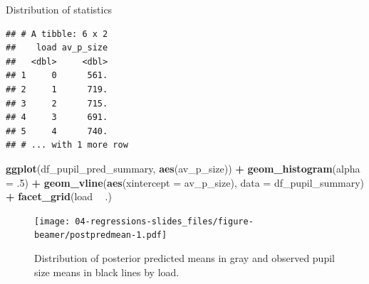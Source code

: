 \documentclass[12pt,ignorenonframetext,aspectratio=169]{beamer}
\newenvironment{Shaded}{\begin{snugshade}}{\end{snugshade}}
\newcommand{\CommentTok}[1]{\textcolor[rgb]{0.56,0.35,0.01}{\textit{#1}}}
\newcommand{\DataTypeTok}[1]{\textcolor[rgb]{0.13,0.29,0.53}{#1}}
\newcommand{\FloatTok}[1]{\textcolor[rgb]{0.00,0.00,0.81}{#1}}
\newcommand{\KeywordTok}[1]{\textcolor[rgb]{0.13,0.29,0.53}{\textbf{#1}}}
\newcommand{\NormalTok}[1]{#1}
\newcommand{\OperatorTok}[1]{\textcolor[rgb]{0.81,0.36,0.00}{\textbf{#1}}}
\newcommand{\StringTok}[1]{\textcolor[rgb]{0.31,0.60,0.02}{#1}}
\begin{document}
\begin{frame}[fragile]{Distribution of statistics}
\protect\hypertarget{distribution-of-statistics}{}

\scriptsize

\begin{Shaded}
\end{Shaded}

\begin{verbatim}
## # A tibble: 6 x 2
##    load av_p_size
##   <dbl>     <dbl>
## 1     0      561.
## 2     1      719.
## 3     2      715.
## 4     3      691.
## 5     4      740.
## # ... with 1 more row
\end{verbatim}

\normalsize

\end{frame}

\begin{frame}[fragile]



\scriptsize

\begin{Shaded}
\begin{Highlighting}[]
\KeywordTok{ggplot}\NormalTok{(df_pupil_pred_summary, }\KeywordTok{aes}\NormalTok{(av_p_size)) }\OperatorTok{+}
\StringTok{  }\KeywordTok{geom_histogram}\NormalTok{(}\DataTypeTok{alpha =} \FloatTok{.5}\NormalTok{) }\OperatorTok{+}
\StringTok{  }\KeywordTok{geom_vline}\NormalTok{(}\KeywordTok{aes}\NormalTok{(}\DataTypeTok{xintercept =}\NormalTok{ av_p_size), }\DataTypeTok{data =}\NormalTok{ df_pupil_summary) }\OperatorTok{+}
\StringTok{  }\KeywordTok{facet_grid}\NormalTok{(load }\OperatorTok{~}\StringTok{ }\NormalTok{.)}
\end{Highlighting}
\end{Shaded}

\begin{figure}
\centering
\texttt{[image: 04-regressions-slides\_files/figure-beamer/postpredmean-1.pdf]}
\caption{\label{fig:postpredmean}Distribution of posterior predicted means in gray and observed pupil size means in black lines by load.}
\end{figure}

\normalsize

\end{frame}
\end{document}
